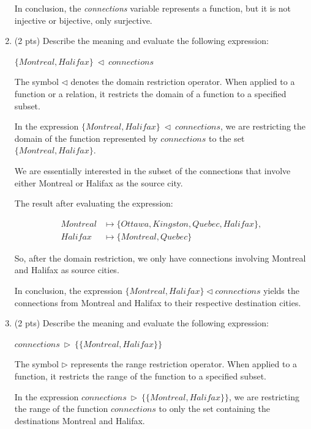 \documentclass[12pt]{article}
\begin{document}
\begin{spacing}{1.5}
\begin{enumerate}
		      In conclusion, the \textit{connections} variable represents a function, but it is not injective or bijective, only surjective.
		      
		\item (2 pts) Describe the meaning and evaluate the following expression:
		      
		      \indent $\{Montreal, Halifax\} \: \triangleleft \: connections$
		      
		      The symbol $\triangleleft$ denotes the domain restriction operator. When applied to a function or a relation, it restricts the domain of a function to a specified subset.
		      
		      In the expression $\{Montreal, Halifax\} \: \triangleleft \: connections$, we are restricting the domain of the function represented by $connections$ to the set $\{Montreal, Halifax\}$.
		      
		      We are essentially interested in the subset of the connections that involve either Montreal or Halifax as the source city.
		      
		      The result after evaluating the expression:
		          
		      \begin{align*}
		      	Montreal & \mapsto \{Ottawa, Kingston, Quebec, Halifax\}, \\
		      	Halifax  & \mapsto \{Montreal, Quebec\}                   
		      \end{align*}
		      
		      So, after the domain restriction, we only have connections involving Montreal and Halifax as source cities.
		      
		      In conclusion, the expression $\{Montreal, Halifax\} \triangleleft connections$ yields the connections from Montreal and Halifax to their respective destination cities.
		      
		\item (2 pts) Describe the meaning and evaluate the following expression:
		      
		      \indent $connections \: \triangleright \: \{\{Montreal, Halifax\}\}$
		      
		      The symbol $\triangleright$ represents the range restriction operator. When applied to a function, it restricts the range of the function to a specified subset.
		      
		      In the expression $connections \: \triangleright \: \{\{Montreal, Halifax\}\}$, we are restricting the range of the function $connections$ to only the set containing the destinations Montreal and Halifax.
		      

\end{enumerate}
\end{spacing}
\end{document}
